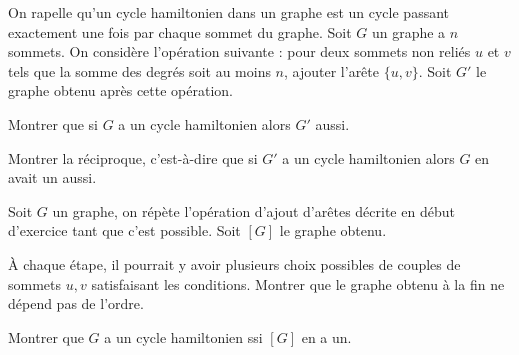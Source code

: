 \documentclass[french]{report}
\begin{document}
\begin{exo}
    On rapelle qu'un cycle hamiltonien dans un graphe est un cycle passant exactement
    une fois par chaque sommet du graphe. Soit \(G\) un graphe a \(n\) sommets. On
    considère l'opération suivante : pour deux sommets non reliés \(u\) et \(v\) tels
    que la somme des degrés soit au moins \(n\), ajouter l'arête \(\{u,v\}\). Soit
    \(G'\) le graphe obtenu après cette opération.
    \begin{q}{1}
        Montrer que si \(G\) a un cycle hamiltonien alors \(G'\) aussi.
    \end{q}
    \begin{q}{2}
        Montrer la réciproque, c'est-à-dire que si \(G'\) a un cycle hamiltonien
        alors \(G\) en avait un aussi.
    \end{q}
    Soit \(G\) un graphe, on répète l'opération d'ajout d'arêtes décrite en début
    d'exercice tant que c'est possible. Soit \([G]\) le graphe obtenu.
    \begin{q}{3}
        À chaque étape, il pourrait y avoir plusieurs choix possibles de couples
        de sommets \(u,v\) satisfaisant les conditions. Montrer que le graphe
        obtenu à la fin ne dépend pas de l'ordre.
    \end{q}
    \begin{q}{4}
        Montrer que \(G\) a un cycle hamiltonien ssi \([G]\) en a un.
    \end{q}

\end{exo}
\end{document}
